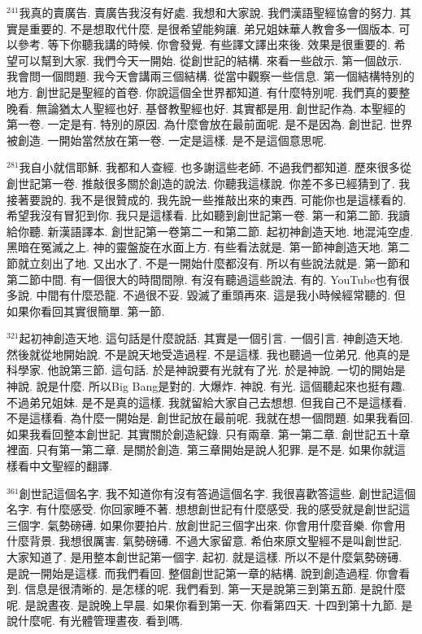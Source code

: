 \documentclass{book}
\begin{document}
$^{241}$我真的賣廣告.
賣廣告我沒有好處.
我想和大家說.
我們漢語聖經協會的努力.
其實是重要的.
不是想取代什麼.
是很希望能夠讓.
弟兄姐妹華人教會多一個版本.
可以參考.
等下你聽我講的時候.
你會發覺.
有些譯文譯出來後.
效果是很重要的.
希望可以幫到大家.
我們今天一開始.
從創世記的結構.
來看一些啟示.
第一個啟示.
我會問一個問題.
我今天會講兩三個結構.
從當中觀察一些信息.
第一個結構特別的地方.
創世記是聖經的首卷.
你說這個全世界都知道.
有什麼特別呢.
我們真的要整晚看.
無論猶太人聖經也好.
基督教聖經也好.
其實都是用.
創世記作為.
本聖經的第一卷.
一定是有.
特別的原因.
為什麼會放在最前面呢.
是不是因為.
創世記.
世界被創造.
一開始當然放在第一卷.
一定是這樣.
是不是這個意思呢.

$^{281}$我自小就信耶穌.
我都和人查經.
也多謝這些老師.
不過我們都知道.
歷來很多從創世記第一卷.
推敲很多關於創造的說法.
你聽我這樣說.
你差不多已經猜到了.
我接著要說的.
我不是很贊成的.
我先說一些推敲出來的東西.
可能你也是這樣看的.
希望我沒有冒犯到你.
我只是這樣看.
比如聽到創世記第一卷.
第一和第二節.
我讀給你聽.
新漢語譯本.
創世記第一卷第二一和第二節.
起初神創造天地.
地混沌空虛.
黑暗在冤滅之上.
神的靈盤旋在水面上方.
有些看法就是.
第一節神創造天地.
第二節就立刻出了地.
又出水了.
不是一開始什麼都沒有.
所以有些說法就是.
第一節和第二節中間.
有一個很大的時間間隙.
有沒有聽過這些說法.
有的.
YouTube也有很多說.
中間有什麼恐龍.
不過很不妥.
毀滅了重頭再來.
這是我小時候經常聽的.
但如果你看回其實很簡單.
第一節.

$^{321}$起初神創造天地.
這句話是什麼說話.
其實是一個引言.
一個引言.
神創造天地.
然後就從地開始說.
不是說天地受造過程.
不是這樣.
我也聽過一位弟兄.
他真的是科學家.
他說第三節.
這句話.
於是神說要有光就有了光.
於是神說.
一切的開始是神說.
說是什麼.
所以Big Bang是對的.
大爆炸.
神說.
有光.
這個聽起來也挺有趣.
不過弟兄姐妹.
是不是真的這樣.
我就留給大家自己去想想.
但我自己不是這樣看.
不是這樣看.
為什麼一開始是.
創世記放在最前呢.
我就在想一個問題.
如果我看回.
如果我看回整本創世記.
其實關於創造紀錄.
只有兩章.
第一第二章.
創世記五十章裡面.
只有第一第二章.
是關於創造.
第三章開始是說人犯罪.
是不是.
如果你就這樣看中文聖經的翻譯.

$^{361}$創世記這個名字.
我不知道你有沒有答過這個名字.
我很喜歡答這些.
創世記這個名字.
有什麼感受.
你回家睡不著.
想想創世記有什麼感受.
我的感受就是創世記這三個字.
氣勢磅礡.
如果你要拍片.
放創世記三個字出來.
你會用什麼音樂.
你會用什麼背景.
我想很厲害.
氣勢磅礡.
不過大家留意.
希伯來原文聖經不是叫創世記.
大家知道了.
是用整本創世記第一個字.
起初.
就是這樣.
所以不是什麼氣勢磅礡.
是說一開始是這樣.
而我們看回.
整個創世記第一章的結構.
說到創造過程.
你會看到.
信息是很清晰的.
是怎樣的呢.
我們看到.
第一天是說第三到第五節.
是說什麼呢.
是說晝夜.
是說晚上早晨.
如果你看到第一天.
你看第四天.
十四到第十九節.
是說什麼呢.
有光體管理晝夜.
看到嗎.
\end{document}
